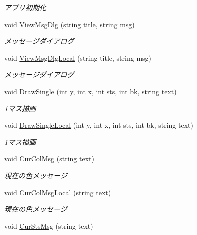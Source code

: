 \begin{DoxyCompactItemize}
\begin{DoxyCompactList}\small\item\em アプリ初期化 \end{DoxyCompactList}\item 
void \hyperlink{class_reversi_wpf_1_1_main_window_aa776c697ed89869c9799576f2f6022b9}{View\+Msg\+Dlg} (string title, string msg)
\begin{DoxyCompactList}\small\item\em メッセージダイアログ \end{DoxyCompactList}\item 
void \hyperlink{class_reversi_wpf_1_1_main_window_a3095c98dbf6fcd1f738354a06797beb1}{View\+Msg\+Dlg\+Local} (string title, string msg)
\begin{DoxyCompactList}\small\item\em メッセージダイアログ \end{DoxyCompactList}\item 
void \hyperlink{class_reversi_wpf_1_1_main_window_aa7f29f9037ca59f0b41d4b383875bb5e}{Draw\+Single} (int y, int x, int sts, int bk, string text)
\begin{DoxyCompactList}\small\item\em 1マス描画 \end{DoxyCompactList}\item 
void \hyperlink{class_reversi_wpf_1_1_main_window_a88fd4a18ce06e08801a3370147bc3a8b}{Draw\+Single\+Local} (int y, int x, int sts, int bk, string text)
\begin{DoxyCompactList}\small\item\em 1マス描画 \end{DoxyCompactList}\item 
void \hyperlink{class_reversi_wpf_1_1_main_window_a5dd2bbfd5f17c36d1b301fdb91b483ad}{Cur\+Col\+Msg} (string text)
\begin{DoxyCompactList}\small\item\em 現在の色メッセージ \end{DoxyCompactList}\item 
void \hyperlink{class_reversi_wpf_1_1_main_window_a92d45fe8b0224e36ce974e04388ec541}{Cur\+Col\+Msg\+Local} (string text)
\begin{DoxyCompactList}\small\item\em 現在の色メッセージ \end{DoxyCompactList}\item 
void \hyperlink{class_reversi_wpf_1_1_main_window_a90e6aa75849526159fe9348da2b66fb0}{Cur\+Sts\+Msg} (string text)

\end{DoxyCompactItemize}
